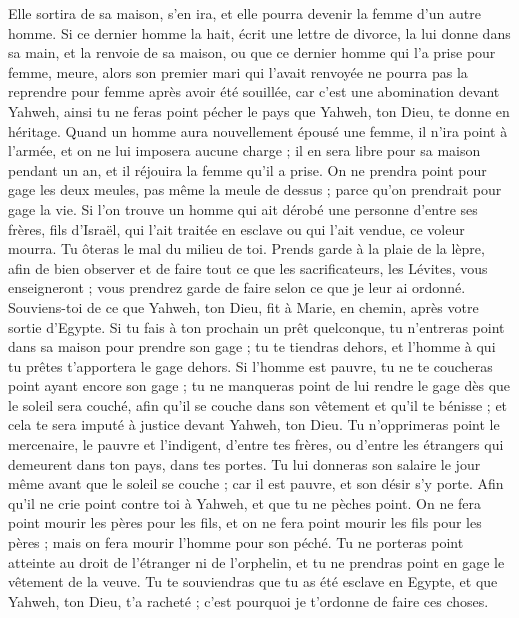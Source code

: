 \begin{multicols}{2}
Elle sortira de sa maison, s’en ira, et elle pourra devenir la femme d’un autre homme.
Si ce dernier homme la hait, écrit une lettre de divorce, la lui donne dans sa main, et la renvoie de sa maison, ou que ce dernier homme qui l'a prise pour femme, meure,
alors son premier mari qui l'avait renvoyée ne pourra pas la reprendre pour femme après avoir été souillée, car c'est une abomination devant Yahweh, ainsi tu ne feras point pécher le pays que Yahweh, ton Dieu, te donne en héritage.
Quand un homme aura nouvellement épousé une femme, il n'ira point à l’armée, et on ne lui imposera aucune charge ; il en sera libre pour sa maison pendant un an, et il réjouira la femme qu'il a prise.
On ne prendra point pour gage les deux meules, pas même la meule de dessus ; parce qu'on prendrait pour gage la vie.
Si l’on trouve un homme qui ait dérobé une personne d’entre ses frères, fils d'Israël, qui l’ait traitée en esclave ou qui l’ait vendue, ce voleur mourra. Tu ôteras le mal du milieu de toi.
Prends garde à la plaie de la lèpre, afin de bien observer et de faire tout ce que les sacrificateurs, les Lévites, vous enseigneront ; vous prendrez garde de faire selon ce que je leur ai ordonné.
Souviens-toi de ce que Yahweh, ton Dieu, fit à Marie, en chemin, après votre sortie d'Egypte.
Si tu fais à ton prochain un prêt quelconque, tu n'entreras point dans sa maison pour prendre son gage ;
tu te tiendras dehors, et l'homme à qui tu prêtes t'apportera le gage dehors.
Si l'homme est pauvre, tu ne te coucheras point ayant encore son gage ;
tu ne manqueras point de lui rendre le gage dès que le soleil sera couché, afin qu'il se couche dans son vêtement et qu'il te bénisse ; et cela te sera imputé à justice devant Yahweh, ton Dieu.
Tu n’opprimeras point le mercenaire, le pauvre et l’indigent, d'entre tes frères, ou d'entre les étrangers qui demeurent dans ton pays, dans tes portes.
Tu lui donneras son salaire le jour même avant que le soleil se couche ; car il est pauvre, et son désir s’y porte. Afin qu'il ne crie point contre toi à Yahweh, et que tu ne pèches point.
On ne fera point mourir les pères pour les fils, et on ne fera point mourir les fils pour les pères ; mais on fera mourir l’homme pour son péché.
Tu ne porteras point atteinte au droit de l'étranger ni de l'orphelin, et tu ne prendras point en gage le vêtement de la veuve.
Tu te souviendras que tu as été esclave en Egypte, et que Yahweh, ton Dieu, t'a racheté ; c'est pourquoi je t’ordonne de faire ces choses.

\end{multicols}
